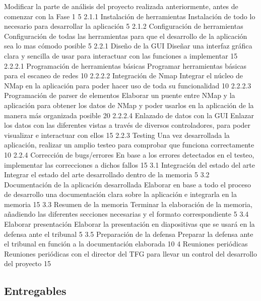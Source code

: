 	{Modificar la parte de análisis del proyecto realizada anteriormente, antes de comenzar con la Fase 1}
	{5}					
\taskframe
	{2.1.1}
	{Instalación de herramientas}
	{Instalación de todo lo necesario para desarrollar la aplicación}
	{5}
\taskframe
	{2.1.2}
	{Configuración de herramientas}
	{Configuración de todas las herramientas para que el desarrollo de la aplicación sea lo mas cómodo posible}
	{5}
\taskframe
	{2.2.1}
	{Diseño de la GUI}
	{Diseñar una interfaz gráfica clara y sencilla de usar para interactuar con las funciones a implementar}
	{15}
\taskframe
	{2.2.2.1}
	{Programación de herramientas básicas}
	{Programar herramientas básicas para el escaneo de redes}
	{10}
\taskframe
	{2.2.2.2}
	{Integración de Nmap}
	{Integrar el núcleo de NMap en la aplicación para poder hacer uso de toda su funcionalidad}
	{10}
\taskframe
	{2.2.2.3}
	{Programación de parser de elementos}
	{Elaborar un puente entre NMap y la aplicación para obtener los datos de NMap y poder usarlos en la aplicación de la manera más organizada posible}
	{20}
\taskframe
	{2.2.2.4}
	{Enlazado de datos con la GUI}
	{Enlazar los datos con las diferentes vistas a través de diversos controladores, para poder visualizar e interactuar con ellos}
	{15}
\taskframe
	{2.2.3}
	{Testing}
	{Una vez desarrollada la aplicación, realizar un amplio testeo para comprobar que funciona correctamente}
	{10}
\taskframe
	{2.2.4}
	{Corrección de bugs/errores}
	{En base a los errores detectados en el testeo, implementar las correcciones a dichos fallos}
	{15}
\taskframe
	{3.1}
	{Integración del estado del arte}
	{Integrar el estado del arte desarrollado dentro de la memoria}
	{5}
\taskframe
	{3.2}
	{Documentación de la aplicación desarrollada}
	{Elaborar en base a todo el proceso de desarrollo una documentación clara sobre la aplicación e integrarla en la memoria}
	{15}
\taskframe
	{3.3}
	{Resumen de la memoria}
	{Terminar la elaboración de la memoria, añadiendo las diferentes secciones necesarias y el formato correspondiente}
	{5}
\taskframe
	{3.4}
	{Elaborar presentación}
	{Elaborar la presentación en diapositivas que se usará en la defensa ante el tribunal}
	{5}
\taskframe
	{3.5}
	{Preparación de la defensa}
	{Preparar la defensa ante el tribunal en función a la documentación elaborada}
	{10}
\taskframe
	{4}
	{Reuniones periódicas}
	{Reuniones periódicas con el director del TFG para llevar un control del desarrollo del proyecto}
	{15}

\subsection{Entregables}

